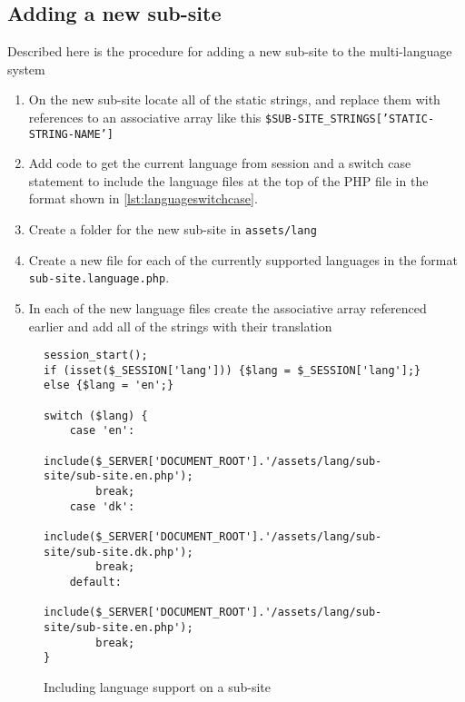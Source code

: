 \subsection{Adding a new sub-site}
Described here is the procedure for adding a new sub-site to the multi-language system
\begin{enumerate}
\item On the new sub-site locate all of the static strings, and replace them with references to an associative array like this \texttt{\$SUB-SITE_STRINGS['STATIC-STRING-NAME']}
\item Add code to get the current language from session and a switch case statement to include the language files at the top of the PHP file in the format shown in \autoref{lst:languageswitchcase}.
\item Create a folder for the new sub-site in \texttt{assets/lang}
\item Create a new file for each of the currently supported languages in the format \texttt{sub-site.language.php}.
\item In each of the new language files create the associative array referenced earlier and add all of the strings with their translation
\end{enumerate}
\begin{figure}[htbp]
\begin{lstlisting}
session_start();
if (isset($_SESSION['lang'])) {$lang = $_SESSION['lang'];} else {$lang = 'en';}

switch ($lang) {
	case 'en':
		include($_SERVER['DOCUMENT_ROOT'].'/assets/lang/sub-site/sub-site.en.php');
		break;
	case 'dk':
		include($_SERVER['DOCUMENT_ROOT'].'/assets/lang/sub-site/sub-site.dk.php');
		break;
	default:
		include($_SERVER['DOCUMENT_ROOT'].'/assets/lang/sub-site/sub-site.en.php');
		break;
}
\end{lstlisting}
\caption{Including language support on a sub-site}
\label{lst:qrcode}
\end{figure}